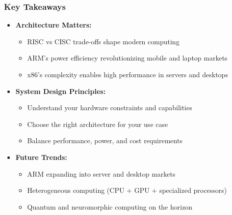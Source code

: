 \documentclass[aspectratio=169,xcolor=dvipsnames]{beamer}
\begin{document}
\begin{frame}
    \frametitle{Key Takeaways}
    \begin{itemize}
        \item \textbf{Architecture Matters:}
        \begin{itemize}
            \item RISC vs CISC trade-offs shape modern computing
            \item ARM's power efficiency revolutionizing mobile and laptop markets
            \item x86's complexity enables high performance in servers and desktops
        \end{itemize}
        \item \textbf{System Design Principles:}
        \begin{itemize}
            \item Understand your hardware constraints and capabilities
            \item Choose the right architecture for your use case
            \item Balance performance, power, and cost requirements
        \end{itemize}
        \item \textbf{Future Trends:}
        \begin{itemize}
            \item ARM expanding into server and desktop markets
            \item Heterogeneous computing (CPU + GPU + specialized processors)
            \item Quantum and neuromorphic computing on the horizon
        \end{itemize}
    \end{itemize}
\end{frame}
\end{document}
